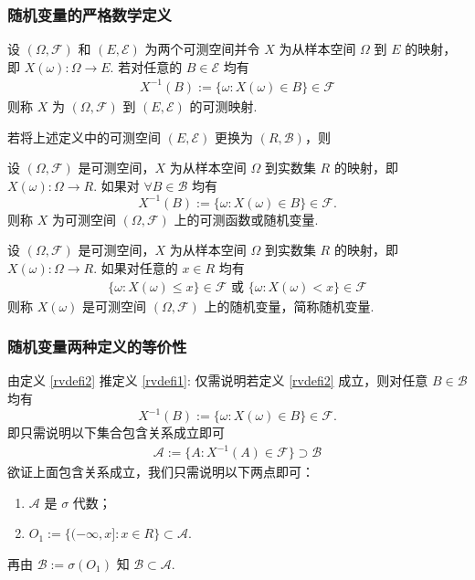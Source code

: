 \documentclass[Prob-All.tex]{subfiles}
\begin{document}
\begin{frame}
	\frametitle{随机变量的严格数学定义}
	\vspace{-0.1cm}
	\begin{defi}[可测映射] 设 $(\Omega,\mathcal{F})$ 和 $(E,\mathcal{E})$ 为两个可测空间并令 $X$ 为从样本空间 $\Omega$ 到 $E$ 的映射，即 $X (\omega):\Omega\rightarrow E$. 若对任意的 $B\in \mathcal{E}$ 均有
		\begin{eqnarray*}
			X^{-1}(B):=\{\omega: X(\omega)\in B\}\in \mathcal{F}
		\end{eqnarray*}
		则称 $X$ 为 $(\Omega,\mathcal{F})$ 到 $(E,\mathcal{E})$ 的可测映射.
	\end{defi}
	\pause %

	若将上述定义中的可测空间 $(E,\mathcal{E})$ 更换为 $(R,\mathcal{B})$，则 %
	\pause
	\begin{defi}[可测函数或随机变量] \label{rvdefi1}\hspace{-0.2cm} 设 $(\Omega,\mathcal{F})$ 是可测空间，$X$ 为从样本空间 $\Omega$ 到实数集 $R$ 的映射，即 $X (\omega):\Omega\rightarrow R$. 如果对 $\forall B\in \mathcal{B}$ 均有
		\[X^{-1}(B):=\{\omega: X(\omega)\in B\}\in \mathcal{F}.\]%
		则称 $X$ 为可测空间 $(\Omega,\mathcal{F})$ 上的可测函数或随机变量.
	\end{defi}%
	\pause
	\begin{defi}[随机变量的另一定义]\hspace{-0.2cm} \label{rvdefi2} 设 $(\Omega,\mathcal{F})$ 是可测空间，$X$ 为从样本空间 $\Omega$ 到实数集 $R$ 的映射，即 $X (\omega):\Omega\rightarrow R$. 如果对任意的 $x\in R$ 均有
		\begin{eqnarray*}
			\{\omega: X (\omega)\le x\}\in \mathcal{F} \mbox{  或  }      \{\omega: X (\omega)< x\}\in \mathcal{F}
		\end{eqnarray*}
		则称 $X (\omega)$ 是可测空间 $(\Omega,\mathcal{F})$ 上的随机变量，简称随机变量.
	\end{defi}
\end{frame}
\begin{frame}
	\frametitle{随机变量两种定义的等价性}
	由定义 \ref{rvdefi2} 推定义 \ref{rvdefi1}: 仅需说明若定义 \ref{rvdefi2} 成立，则对任意 $B\in\mathcal{B}$ 均有
	$$X^{-1}(B):=\{\omega:X(\omega)\in B\}\in \mathcal{F}.$$
	\pause 即只需说明以下集合包含关系成立即可
	\begin{eqnarray*}
		\mathcal{A}:=\{A:X^{-1}(A)\in \mathcal{F}\}\supset \mathcal{B}
	\end{eqnarray*}
	\pause
	欲证上面包含关系成立，我们只需说明以下两点即可：
	\begin{enumerate}[<+-|alert@+>]
		\item $\mathcal{A}$ 是 $\sigma$ 代数；
		\item $O_1:=\{(-\infty,x]:x\in R\}\subset \mathcal{A}$.
	\end{enumerate}
	\pause 再由 $\mathcal{B}:=\sigma (O_1)$ 知 $\mathcal{B}\subset \mathcal{A}$.
\end{frame}
\end{document}
